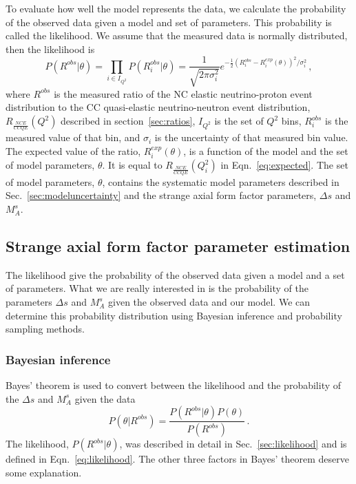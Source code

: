     To evaluate how well the model represents the data, we calculate the
    probability of the observed data given a model and set of parameters.  This
    probability is called the likelihood. We assume that the measured data is
    normally distributed, then the likelihood is
    \begin{equation}\label{eq:likelihood}
      P(R^{obs}|\theta) = \prod_{i\in I_{Q^2}} P(R^{obs}_i|\theta) = \frac{1}{\sqrt{2\pi \sigma_i^2}}
             e^{-\frac{1}{2}(R^{obs}_i - R^{exp}_i(\theta))^2/\sigma_i^2} \,,
    \end{equation}
    where $R^{obs}$ is the measured ratio of the NC elastic neutrino-proton
    event distribution to the CC quasi-elastic neutrino-neutron event
    distribution, $R_{\frac{NCE}{CCQE}}(Q^2)$ described in
    section~\ref{sec:ratios}, $I_{Q^2}$ is the set of $Q^2$ bins, $R^{obs}_i$
    is the measured value of that bin, and $\sigma_i$ is the uncertainty of
    that measured bin value. The expected value of the ratio,
    $R^{exp}_i(\theta)$, is a function of the model and the set of model
    parameters, $\theta$. It is equal to $R_{\frac{NCE}{CCQE}}(Q^2_i)$ in
    Eqn.~\ref{eq:expected}. The set of model parameters, $\theta$, contains the
    systematic model parameters described in Sec.~\ref{sec:modeluncertainty}
    and the strange axial form factor parameters, $\Delta s$ and $M_A^s$.
    

\subsection{Strange axial form factor parameter estimation}\label{deltas}
  The likelihood give the probability of the observed data given a model and a
  set of parameters. What we are really interested in is the probability of the
  parameters $\Delta s$ and $M_A^s$ given the observed data and our model. We can
  determine this probability distribution using Bayesian inference and
  probability sampling methods.

  \subsubsection{Bayesian inference}
    Bayes' theorem is used to convert between the likelihood and the
    probability of the $\Delta s$ and $M_A^s$ given the data
    \begin{equation}
      P(\theta|R^{obs}) = \frac{P(R^{obs}|\theta)P(\theta)}{P(R^{obs})} \,.
    \end{equation}
    The likelihood, $P(R^{obs}|\theta)$, was described in detail in
    Sec.~\ref{sec:likelihood} and is defined in Eqn.~\ref{eq:likelihood}. The
    other three factors in Bayes' theorem deserve some explanation.
    
